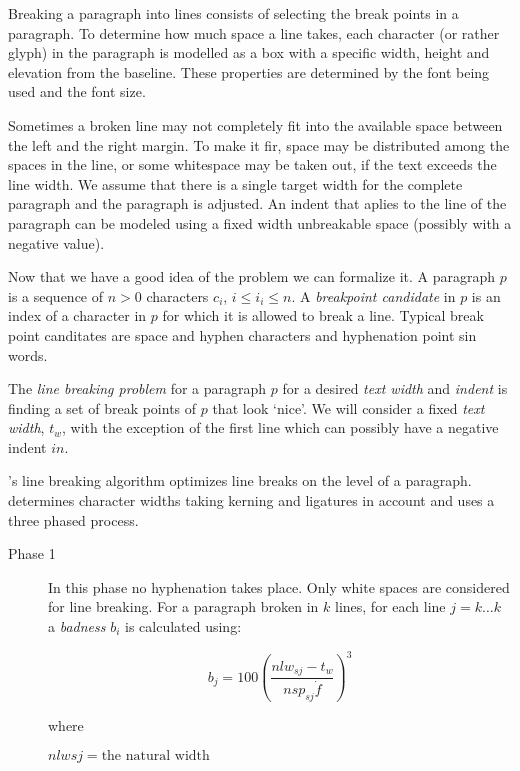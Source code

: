 {{{Breaking a paragraph into lines consists of selecting the break points in a paragraph. To determine how much space a line takes, each character (or rather glyph) in the paragraph is modelled as a box with a specific width, height and elevation from the baseline. These properties are determined by the font being used and the font size.

\scalebox{2}{efficient}

\scalebox{2}{efficient}

Sometimes a broken line may not completely fit into the available space between the left and the right margin. To make it fir, space may be distributed among the spaces in the line, or some whitespace may be taken out, if the text exceeds the 
line width. We assume that there is a single target width for the complete paragraph and the paragraph is adjusted. 
An indent that aplies to the line of the paragraph can be modeled using a fixed width unbreakable space (possibly with a negative value).

Now that we have a good idea of the problem we can formalize it. A paragraph $p$ is a sequence of $n>0$ characters $c_i$,  $i\leq i_i \leq n$.
A \textit{breakpoint candidate} in $p$ is an index of a character in $p$ for which it is allowed to break a line. Typical break point canditates are space and hyphen characters and hyphenation point sin words.

The \textit{line breaking problem} for a paragraph $p$ for a desired \textit{text width} and \textit{indent} is finding a set of break points of $p$ that look `nice'. We will consider a fixed \textit{text width}, $t_w$, with the exception of the first line which can possibly have a negative indent $in$.

\tex's line breaking algorithm optimizes line breaks on the level of a paragraph. \tex determines character widths taking kerning and ligatures in account and uses a three phased process. 

\begin{description}
\item[Phase 1] In this phase no hyphenation takes place. Only white spaces are considered  for line breaking. For a paragraph broken in $k$ lines, for each line $j=k\ldots k$  a \textit{badness} $b_i$ is calculated using:

$$b_j=100\left(\frac{nlw_{sj}-t_w}{nsp_{sj}\dot f}\right)^{3}$$

where 

$nlw{sj} = \text{the natural width}$



\end{description}}}}
